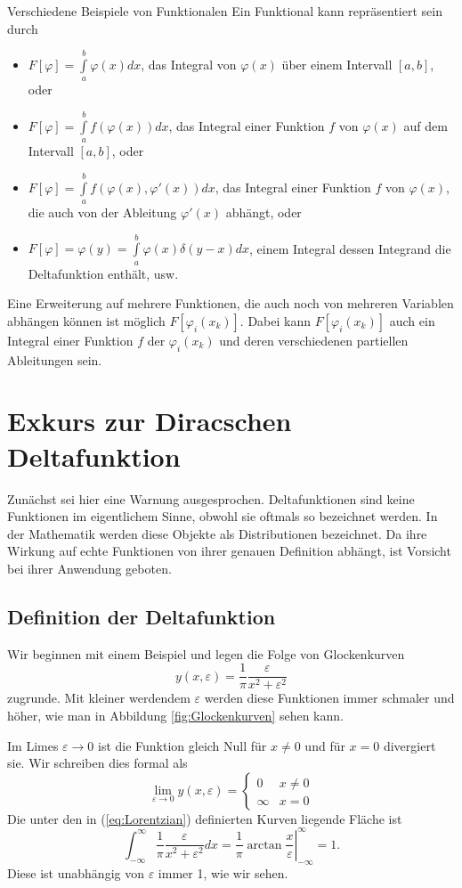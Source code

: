 \begin{example}{Verschiedene Beispiele von Funktionalen}
Ein Funktional kann repräsentiert sein durch
\begin{itemize}
\item 
$F[\varphi]=\int\limits_a^b\varphi(x)dx$, das Integral von $\varphi(x)$
  über einem Intervall $[a,b]$, oder
\item 
  $F[\varphi]=\int\limits_a^bf(\varphi(x))dx$, das Integral einer Funktion
  $f$ von $\varphi(x)$ auf dem Intervall $[a,b]$, oder
\item 
  $F[\varphi]=\int\limits_a^bf(\varphi(x), \varphi'(x))dx$, das Integral
  einer Funktion $f$ von $\varphi(x)$, die auch von der Ableitung $\varphi'(x)$
  abhängt, oder 
\item 
  $F[\varphi]=\varphi(y)=\int\limits_a^b\varphi(x)\delta(y-x)dx$, einem
  Integral dessen Integrand die Deltafunktion enthält, usw. 
\end{itemize}
  Eine Erweiterung auf mehrere Funktionen, die auch noch von mehreren Variablen
  abhängen können ist möglich $F[\varphi_i(x_k)]$. Dabei kann
  $F[\varphi_i(x_k)]$ auch ein Integral einer Funktion $f$ der $\varphi_i(x_k)$
  und deren verschiedenen partiellen Ableitungen sein.
\end{example}
\section{Exkurs zur Diracschen Deltafunktion}\label{sec:Deltafunktion}
Zunächst sei hier eine Warnung ausgesprochen. Deltafunktionen sind keine
Funktionen im eigentlichem Sinne, obwohl sie oftmals so bezeichnet werden. In
der Mathematik werden diese Objekte als Distributionen bezeichnet. Da ihre
Wirkung auf echte Funktionen von ihrer genauen Definition abhängt, ist
Vorsicht bei ihrer Anwendung geboten.
\subsection{Definition der Deltafunktion}
Wir beginnen mit einem Beispiel und legen die Folge von Glockenkurven
\begin{equation}\label{eq:Lorentzian}
y(x,\varepsilon)=\frac{1}{\pi}\frac{\varepsilon}{x^2+\varepsilon^2}
\end{equation}
zugrunde. Mit kleiner werdendem $\varepsilon$ werden diese Funktionen immer
schmaler und höher, wie man in Abbildung \ref{fig:Glockenkurven} sehen kann.

Im Limes $\varepsilon\rightarrow 0$ ist die Funktion gleich Null für $x\ne 0$
und für $x=0$ divergiert sie. Wir schreiben dies formal als
\[ \lim_{\varepsilon\rightarrow 0} y(x,\varepsilon)=
  \left\{\begin{matrix}0& x\ne 0\\\infty& x=0\end{matrix}\right.\]
Die unter den in (\ref{eq:Lorentzian}) definierten Kurven liegende Fläche ist
\[\int_{-\infty}^{\infty}\frac{1}{\pi}\frac{\varepsilon}{x^2+\varepsilon^2}dx=
  \left.\frac{1}{\pi}\arctan \frac{x}{\varepsilon}\right|_{-\infty}^{\infty}=1.\]
Diese ist unabhängig von $\varepsilon$ immer 1, wie wir sehen.

